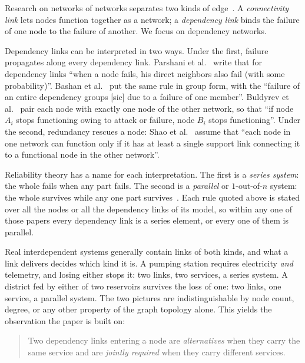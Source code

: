 \documentclass{svproc}
\begin{document}
Research on networks of networks separates two kinds of
edge~\cite{parshani_critical_2011,bashan_percolation_2011}. A \emph{connectivity
link} lets nodes function together as a network; a \emph{dependency link} binds
the failure of one node to the failure of another. We focus on dependency networks.

Dependency links can be interpreted in two ways. Under the first, failure propagates
along every dependency link. Parshani et
al.~\cite{parshani_critical_2011} write that for dependency links ``when a node
fails, his direct neighbors also fail (with some probability)''. Bashan et
al.~\cite{bashan_percolation_2011} put the same rule in group form, with the
``failure of an entire dependency groups [sic] due to a failure of one
member''.
Buldyrev et al.~\cite{buldyrev_catastrophic_2010} pair each node with exactly one
node of the other network, so that ``if node $A_i$ stops functioning owing to
attack or failure, node $B_i$ stops functioning''. Under the second, redundancy
rescues a node: Shao et al.~\cite{shao_cascade_2011} assume that ``each node in
one network can function only if it has at least a single support link connecting
it to a functional node in the other network''.

Reliability theory has a name for each interpretation. The first is a \emph{series system}: the
whole fails when any part fails. The second is a \emph{parallel} or
$1$-out-of-$n$ system: the whole survives while any one part
survives~\cite{rausand_system_2008}. Each rule quoted above is stated over all
the nodes or all the dependency links of its model, so within any one of those
papers every dependency link is a series element, or every one of them is
parallel.

Real interdependent systems generally contain links of both kinds, and what a
link delivers decides which kind it is. A pumping station requires electricity
\emph{and} telemetry, and losing either stops it: two links, two services, a
series system. A district fed by either of two reservoirs survives the loss of
one: two links, one service, a parallel system. The two pictures are
indistinguishable by node count, degree, or any other property of the graph
topology alone. This yields the observation the paper is built on:

\begin{quote}
Two dependency links entering a node are \emph{alternatives} when they carry the
same service and are \emph{jointly required} when they carry different services.
\end{quote}
\end{document}
